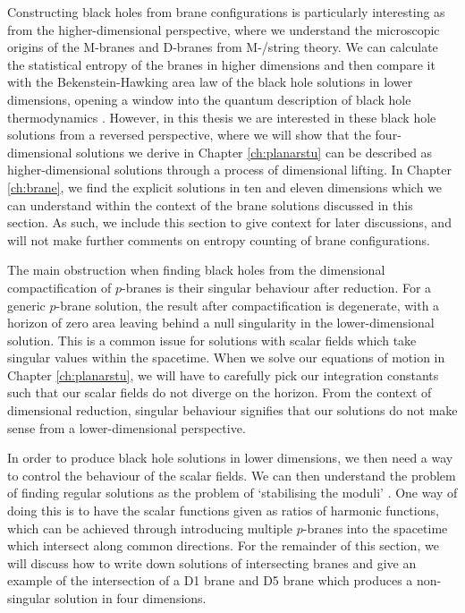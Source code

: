 Constructing black holes from brane configurations is particularly interesting as from the higher-dimensional perspective, where we understand the microscopic origins of the M-branes and D-branes from M-/string theory. We can calculate the statistical entropy of the branes in higher dimensions and then compare it with the Bekenstein-Hawking area law of the black hole solutions in lower dimensions, opening a window into the quantum description of black hole thermodynamics \cite{Strominger:1996sh, Maldacena:1996ky,  Dabholkar:2004yr}. However, in this thesis we are interested in these black hole solutions from a reversed perspective, where we will show that the four-dimensional solutions we derive in Chapter \ref{ch:planarstu} can be described as higher-dimensional solutions through a process of dimensional lifting. In Chapter \ref{ch:brane}, we find the explicit solutions in ten and eleven dimensions which we can understand within the context of the brane solutions discussed in this section. As such, we include this section to give context for later discussions, and will not make further comments on entropy counting of brane configurations.

The main obstruction when finding black holes from the dimensional compactification of $p$-branes is their singular behaviour after reduction. For a generic $p$-brane solution, the result after compactification is degenerate, with a horizon of zero area leaving behind a null singularity in the lower-dimensional solution. This is a common issue for solutions with scalar fields which take singular values within the spacetime. When we solve our equations of motion in Chapter \ref{ch:planarstu}, we will have to carefully pick our integration constants such that our scalar fields do not diverge on the horizon. From the context of dimensional reduction, singular behaviour signifies that our solutions do not make sense from a lower-dimensional perspective.

In order to produce black hole solutions in lower dimensions, we then need a way to control the behaviour of the scalar fields. We can then understand the problem of finding regular solutions as the problem of `stabilising the moduli' \cite{Mohaupt:2000gc}. One way of doing this is to have the scalar functions given as ratios of harmonic functions, which can be achieved through introducing multiple $p$-branes into the spacetime which intersect along common directions. For the remainder of this section, we will discuss how to write down solutions of intersecting branes and give an example of the intersection of a D1 brane and D5 brane which produces a non-singular solution in four dimensions.

